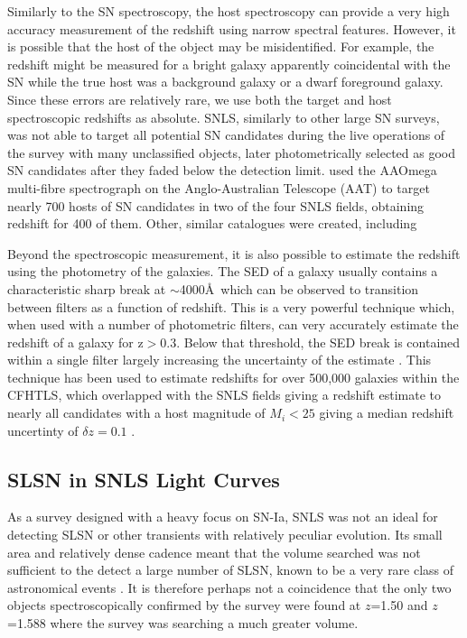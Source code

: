 Similarly to the SN spectroscopy, the host spectroscopy can provide a very high accuracy measurement of the redshift using narrow spectral features. However, it is possible that the host of the object may be misidentified. For example, the redshift might be measured for a bright galaxy apparently coincidental with the SN while the true host was a background galaxy or a dwarf foreground galaxy. Since these errors are relatively rare, we use both the target and host spectroscopic redshifts as absolute. SNLS, similarly to other large SN surveys, was not able to target all potential SN candidates during the live operations of the survey with many unclassified objects, later photometrically selected as good SN candidates after they faded below the detection limit. \citet{Lidman2012} used the AAOmega multi-fibre spectrograph on the Anglo-Australian Telescope (AAT) to target nearly 700 hosts of SN candidates in two of the four SNLS fields, obtaining redshift for 400 of them. Other, similar catalogues were created, including \citet{Lilly2007,LeFevre2013}

Beyond the spectroscopic measurement, it is also possible to estimate the redshift using the photometry of the galaxies. The SED of a galaxy usually contains a characteristic sharp break at $\sim$4000\AA ~which can be observed to transition between filters as a function of redshift. This is a very powerful technique which, when used with a number of photometric filters, can very accurately estimate the redshift of a galaxy for z$>$0.3. Below that threshold, the SED break is contained within a single filter largely increasing the uncertainty of the estimate \citep{Connolly1995}. This technique has been used to estimate redshifts for over 500,000 galaxies within the CFHTLS, which overlapped with the SNLS fields giving a redshift estimate to nearly all candidates with a host magnitude of $M_{i}<25$ giving a median redshift uncertinty of $\delta z = 0.1$ \citep{Ilbert2006}.

\subsection{SLSN in SNLS Light Curves}
As a survey designed with a heavy focus on SN-Ia, SNLS was not an ideal for detecting SLSN or other transients with relatively peculiar evolution. Its small area and relatively dense cadence meant that the volume searched was not sufficient to the detect a large number of SLSN, known to be a very rare class of astronomical events \citep{Cooke2012,Prajs2016,Quimby2013}. It is therefore perhaps not a coincidence that the only two objects spectroscopically confirmed by the survey were found at $z$=1.50 and $z$=1.588 where the survey was searching a much greater volume.

